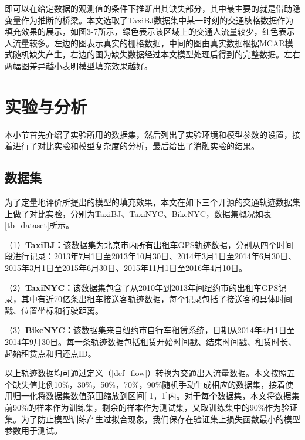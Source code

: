 即可以在给定数据的观测值的条件下推断出其缺失部分，其中最主要的就是借助隐变量作为推断的桥梁。本文选取了TaxiBJ数据集中某一时刻的交通梜格数据作为填充效果的展示，如图3-7所示，绿色表示该区域上的交通人流量较少，红色表示人流量较多。左边的图表示真实的栅格数据，中间的图由真实数据根据MCAR模式随机缺失产生，右边的图为缺失数据经过本文模型处理后得到的完整数据。左右两幅图差异越小表明模型填充效果越好。

\section{实验与分析}
本小节首先介绍了实验所用的数据集，然后列出了实验环境和模型参数的设置，接着进行了对比实验和模型复杂度的分析，最后给出了消融实验的结果。
\subsection{数据集}
为了定量地评价所提出的模型的填充效果，本文在如下三个开源的交通轨迹数据集上做了对比实验，分别为TaxiBJ\cite{zhang2017deep}、TaxiNYC\cite{illinoisdatabankIDB-9610843}、BikeNYC\cite{zhang2017deep}，数据集概况如表\ref{tb_dataset}所示。

（1）\textbf{TaxiBJ：}该数据集为北京市内所有出租车GPS轨迹数据，分别从四个时间段进行记录：2013年7月1日至2013年10月30日、2014年3月1日至2014年6月30日、2015年3月1日至2015年6月30日、2015年11月1日至2016年4月10日。

（2）\textbf{TaxiNYC：}该数据集包含了从2010年到2013年间纽约市的出租车GPS记录，其中有近70亿条出租车接送客轨迹数据，每个记录包括了接送客的具体时间戳、位置坐标和行驶距离。

（3）\textbf{BikeNYC：}该数据集来自纽约市自行车租赁系统，日期从2014年4月1日至2014年9月30日。每一条轨迹数据包括租赁开始时间戳、结束时间戳、租赁时长、起始租赁点和归还点ID。

以上轨迹数据均可通过定义（\ref{def_flow}）转换为交通出入流量数据。本文按照五个缺失值比例10\%，30\%，50\%，70\%，90\%随机手动生成相应的数据集，接着使用归一化将数据集数值范围缩放到区间[-1，1]内。对于每个数据集，本文将数据集前90\%的样本作为训练集，剩余的样本作为测试集，又取训练集中的90\%作为验证集。为了防止模型训练产生过拟合现象，我们保存在验证集上损失函数最小的模型参数用于测试。


